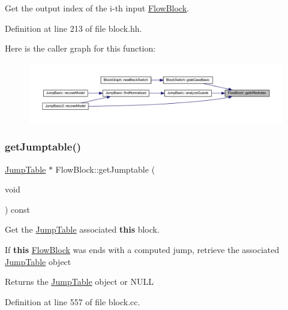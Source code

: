 Get the output index of the i-\/th input \mbox{\hyperlink{class_flow_block}{Flow\+Block}}. 



Definition at line 213 of file block.\+hh.

Here is the caller graph for this function\+:
\nopagebreak
\begin{figure}[H]
\begin{center}
\leavevmode
\includegraphics[width=350pt]{class_flow_block_ad2fda4d5ab45b5a7f63b5632139a2868_icgraph}
\end{center}
\end{figure}
\mbox{\label{class_flow_block_a6791d31146a1bb676caa165ad5950c2d}} 
\subsubsection{\texorpdfstring{getJumptable()}{getJumptable()}}
{\footnotesize\ttfamily \mbox{\hyperlink{class_jump_table}{Jump\+Table}} $\ast$ Flow\+Block\+::get\+Jumptable (\begin{DoxyParamCaption}\item[{void}]{ }\end{DoxyParamCaption}) const}



Get the \mbox{\hyperlink{class_jump_table}{Jump\+Table}} associated {\bfseries{this}} block. 

If {\bfseries{this}} \mbox{\hyperlink{class_flow_block}{Flow\+Block}} was ends with a computed jump, retrieve the associated \mbox{\hyperlink{class_jump_table}{Jump\+Table}} object \begin{DoxyReturn}{Returns}
the \mbox{\hyperlink{class_jump_table}{Jump\+Table}} object or N\+U\+LL 
\end{DoxyReturn}


Definition at line 557 of file block.\+cc.

